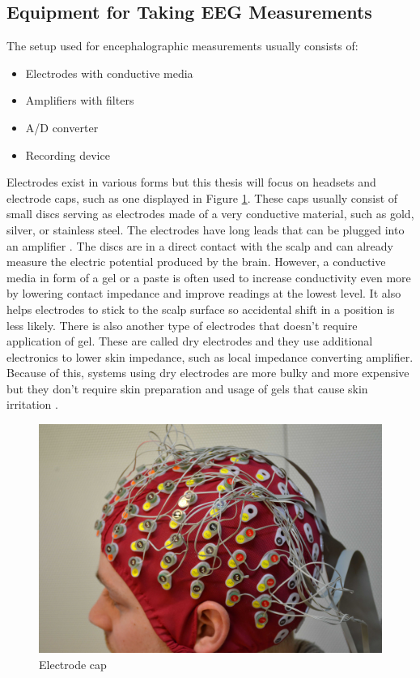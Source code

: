 \subsection{Equipment for Taking EEG Measurements}
The setup used for encephalographic measurements usually consists of: 
\begin{itemize}
  \item Electrodes with conductive media
  \item Amplifiers with filters
  \item A/D converter
  \item Recording device
\end{itemize}
Electrodes exist in various forms but this thesis will focus on
headsets and electrode caps, such as one displayed in Figure \ref{fig:eegCap}.
These caps usually consist of small discs serving as electrodes made
of a very conductive material, such as gold, silver, or stainless steel. The electrodes have long leads that can be plugged into an
amplifier \cite{eegFund}. The discs are in a direct contact with the scalp and can already
measure the electric potential produced by the brain. However, a conductive media in form of a
gel or a paste is often used to increase conductivity even more by lowering
contact impedance and improve readings at the lowest level. It also helps
electrodes to stick to the scalp surface so accidental shift in a position is less likely. There is also another type of electrodes that doesn't require application of gel. These are called dry electrodes and they use additional electronics to lower skin impedance, such as local impedance converting amplifier. Because of this, systems using dry electrodes are more bulky and more expensive but they don't require skin preparation and usage of gels that cause skin irritation \cite{dryElectrodes}. 

\begin{figure}[htb]
	\centering
	\includegraphics[width=1\linewidth]{fig/eegCap.jpg}
	\caption[Caption for LOF]{Electrode cap\protect\footnotemark}
	\label{fig:eegCap}
\end{figure}

